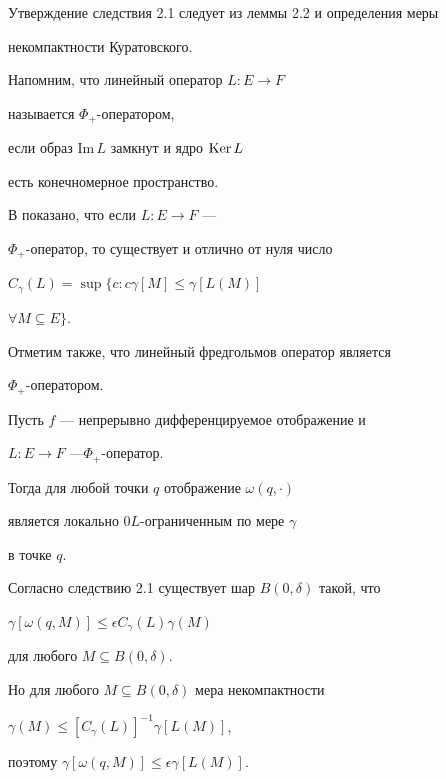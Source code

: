Утверждение следствия 2.1 следует из леммы 2.2 и определения меры 


некомпактности Куратовского.





Напомним, что линейный оператор $L : E \to F$


называется $\Phi_+$-оператором,


если образ $\text{Im}\, L$ замкнут и ядро $\operatorname{Ker} L$


есть конечномерное пространство.


В \cite{10} показано, что если $L : E \to F$ --- 


$\Phi_+$-оператор, то существует и отлично от нуля число 


$C_\gamma (L) = \sup \{c : c\gamma [M] \leq  \gamma [L(M)]$ 


$\forall M\subseteq E \}$.


Отметим также, что линейный фредгольмов оператор является 


$\Phi_+$-оператором.





\begin{lems}


Пусть $f$ --- непрерывно дифференцируемое отображение и 


$ L:E\to F $ ---\linebreak $\Phi_+$-оператор.


Тогда для любой точки $q$ отображение $\omega (q,\cdot)$


является локально $0 L$-огра\-ни\-чен\-ным по мере $\gamma$


в точке $q$.


\end{lems}





\begin{pf}


Согласно следствию 2.1 существует шар $B(0,\delta)$ такой, что 


$\gamma [\omega (q,M)] \leq 


\epsilon C_\gamma (L) \gamma (M)$


для любого $M \subseteq B(0,\delta)$.


Но для любого $M \subseteq B(0,\delta)$ мера некомпактности 


$\gamma (M) \leq [C_\gamma (L)]^{-1}  \gamma [L(M)]$,


поэтому $ \gamma [\omega (q,M)] \leq \epsilon  \gamma [L(M)]$.


\end{pf}






